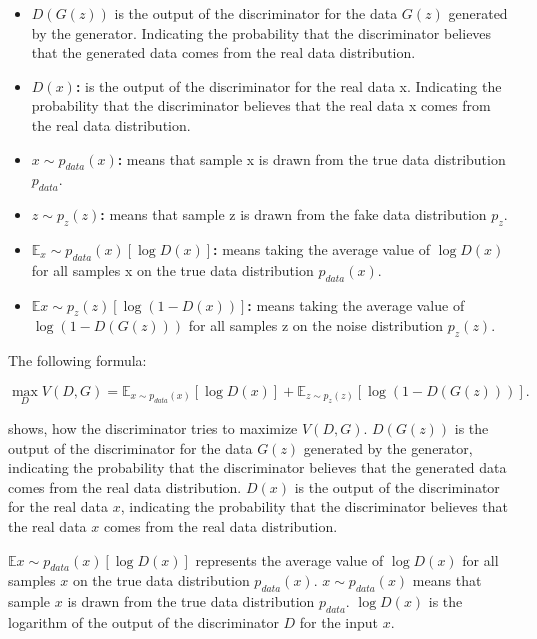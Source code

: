 \begin{itemize}
    \item \textbf{ $D(G(z))$} is the output of the discriminator for the data $G(z)$ generated by the generator. Indicating the probability that the discriminator believes that the generated data comes from the real data distribution.
    \item \textbf{$D(x)$:} is the output of the discriminator for the real data x. Indicating the probability that the discriminator believes that the real data x comes from the real data distribution.
    \item \textbf{ $x \sim p_{data}(x)$:} means that sample x is drawn from the true data distribution $p_{data}$.
    \item \textbf{ $z \sim p_{z}(z)$:} means that sample z is drawn from the fake data distribution $p_{z}$.
    \item \textbf{$\mathbb{E}{_x \sim p_{data}(x)}[\log D(x)]$:} means taking the average value of $\log D(x)$ for all samples x on the true data distribution $p_{data}(x)$.
    \item \textbf{$\mathbb{E}{x \sim p_{z}(z)}[\log (1 - D(x))]$:} means taking the average value of $\log (1 - D(G(z)))$ for all samples z on the noise distribution $p_z(z)$.
\end{itemize}


The following formula:

\begin{equation}
    \label{eq:max}
    \max_{D} V(D, G) = \mathbb{E}_{x \sim p_{data}(x)} [\log D(x)] + \mathbb{E}_{z \sim p_{z}(z)} [\log(1 - D(G(z)))].
\end{equation}

shows, how the discriminator tries to maximize $V(D, G)$. $D(G(z))$ is the output of the discriminator for the data $G(z)$ generated by the generator, 
indicating the probability that the discriminator believes that the generated data comes from the real data distribution.
$D(x)$ is the output of the discriminator for the real data $x$, 
indicating the probability that the discriminator believes that the real data $x$ comes from the real data distribution.

$\mathbb{E}{x \sim p_{data}(x)}[\log D(x)]$ represents the average value of $\log D(x)$ for all samples $x$ on the true data distribution $p_{data}(x)$.
$x \sim p_{data}(x)$ means that sample $x$ is drawn from the true data distribution $p_{data}$.
$\log D(x)$ is the logarithm of the output of the discriminator $D$ for the input $x$.




